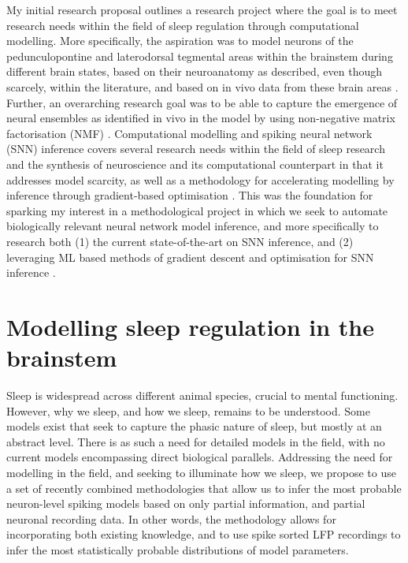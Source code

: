 \documentclass[mphil,deptreport,ai]{infthesis} %
\begin{document}
My initial research proposal outlines a research project where the goal is to meet research needs within the field of sleep regulation through computational modelling.
More specifically, the aspiration was to model neurons of the pedunculopontine and laterodorsal tegmental areas within the brainstem during different brain states, based on their neuroanatomy as described, even though scarcely, within the literature, and based on in vivo data from these brain areas \cite{Herice2019c, Tsunematsu2019, Pal2007, Martinez-Gonzalez2011, Fraigne2015}.
Further, an overarching research goal was to be able to capture the emergence of neural ensembles as identified in vivo in the model by using non-negative matrix factorisation (NMF) \cite{Seung1999, Seung2001, Onken2016a}.
Computational modelling and spiking neural network (SNN) inference covers several research needs within the field of sleep research and the synthesis of neuroscience and its computational counterpart in that it addresses model scarcity, as well as a methodology for accelerating modelling by inference through gradient-based optimisation \cite{Herice2019c, Huh2017, Taherkhani2020}.
This was the foundation for sparking my interest in a methodological project in which we seek to automate biologically relevant neural network model inference, and more specifically to research both (1) the current state-of-the-art on SNN inference, and (2) leveraging ML based methods of gradient descent and optimisation for SNN inference \cite{Huh2017, Mostafa2020, Tavanaei2019b, Lee2016}.


\section{Modelling sleep regulation in the brainstem}

Sleep is widespread across different animal species, crucial to mental functioning. However, why we sleep, and how we sleep, remains to be understood. Some models exist that seek to capture the phasic nature of sleep, but mostly at an abstract level. There is as such a need for detailed models in the field, with no current models encompassing direct biological parallels. Addressing the need for modelling in the field, and seeking to illuminate how we sleep, we propose to use a set of recently combined methodologies that allow us to infer the most probable neuron-level spiking models based on only partial information, and partial neuronal recording data. In other words, the methodology allows for incorporating both existing knowledge, and to use spike sorted LFP recordings to infer the most statistically probable distributions of model parameters.
\end{document}
